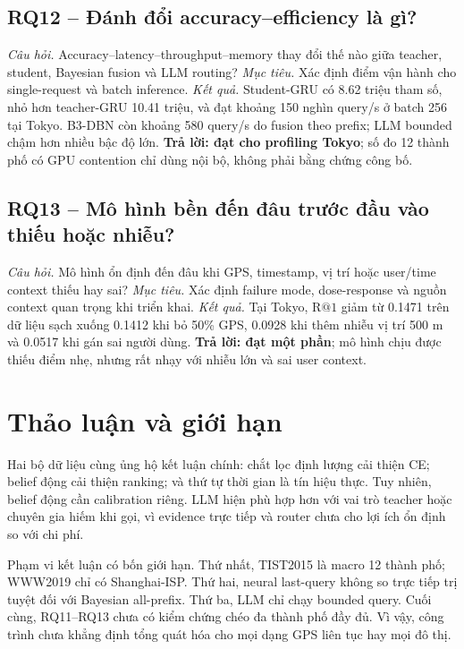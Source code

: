 \documentclass[runningheads]{llncs}
\makeatletter
\newcommand{\Rone}{\mathrm{R@1}}
\makeatother
\begin{document}
\subsection{RQ12 -- Đánh đổi accuracy--efficiency là gì?}
\textit{Câu hỏi.} Accuracy--latency--throughput--memory thay đổi thế nào giữa teacher, student,
Bayesian fusion và LLM routing?
\textit{Mục tiêu.} Xác định điểm vận hành cho single-request và batch inference.
\textit{Kết quả.} Student-GRU có 8.62 triệu tham số, nhỏ hơn teacher-GRU 10.41 triệu, và đạt khoảng
150 nghìn query/s ở batch 256 tại Tokyo. B3-DBN còn khoảng 580 query/s do fusion theo
prefix; LLM bounded chậm hơn nhiều bậc độ lớn. \textbf{Trả lời: đạt cho profiling Tokyo}; số
đo 12 thành phố có GPU contention chỉ dùng nội bộ, không phải bằng chứng công bố.

\subsection{RQ13 -- Mô hình bền đến đâu trước đầu vào thiếu hoặc nhiễu?}
\textit{Câu hỏi.} Mô hình ổn định đến đâu khi GPS, timestamp, vị trí hoặc user/time context thiếu hay sai?
\textit{Mục tiêu.} Xác định failure mode, dose-response và nguồn context quan trọng khi triển khai.
\textit{Kết quả.} Tại Tokyo, $\Rone$ giảm từ 0.1471 trên dữ liệu sạch xuống 0.1412 khi bỏ 50\% GPS,
0.0928 khi thêm nhiễu vị trí 500 m và 0.0517 khi gán sai người dùng. \textbf{Trả lời: đạt một
phần}; mô hình chịu được thiếu điểm nhẹ, nhưng rất nhạy với nhiễu lớn và sai user context.

\fi

\section{Thảo luận và giới hạn}

Hai bộ dữ liệu cùng ủng hộ kết luận chính: chắt lọc định lượng cải thiện CE; belief động cải thiện ranking; và thứ tự thời gian là tín hiệu thực. Tuy nhiên, belief động cần calibration riêng. LLM hiện phù hợp hơn với vai trò teacher hoặc chuyên gia hiếm khi gọi, vì evidence trực tiếp và router chưa cho lợi ích ổn định so với chi phí.

Phạm vi kết luận có bốn giới hạn. Thứ nhất, TIST2015 là macro 12 thành phố; WWW2019 chỉ có Shanghai-ISP. Thứ hai, neural last-query không so trực tiếp trị tuyệt đối với Bayesian all-prefix. Thứ ba, LLM chỉ chạy bounded query. Cuối cùng, RQ11--RQ13 chưa có kiểm chứng chéo đa thành phố đầy đủ. Vì vậy, công trình chưa khẳng định tổng quát hóa cho mọi dạng GPS liên tục hay mọi đô thị.
\end{document}
